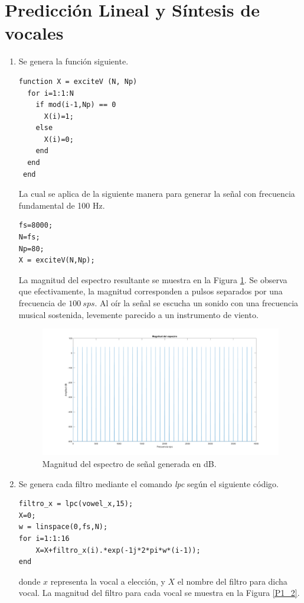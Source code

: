 \documentclass[letterpaper,onecolumn,10pt,journal,final]{IEEEtran}
\begin{document}
\section{Predicción Lineal y Síntesis de vocales}
\begin{enumerate}[1)]
    \item %
%
Se genera la función siguiente.
%
\begin{lstlisting}
function X = exciteV (N, Np)
  for i=1:1:N
    if mod(i-1,Np) == 0
      X(i)=1;
    else
      X(i)=0;
    end
  end
 end
\end{lstlisting}
%
La cual se aplica de la siguiente manera para generar la señal con frecuencia fundamental de 100 Hz.
%
\begin{lstlisting}
fs=8000;
N=fs;
Np=80;
X = exciteV(N,Np);
\end{lstlisting}
%
La magnitud del espectro resultante se muestra en la Figura \ref{P1_1}. Se observa que efectivamente, la magnitud corresponden a pulsos separados por una frecuencia de $100~sps$. Al oír la señal se escucha un sonido con una frecuencia musical sostenida, levemente parecido a un instrumento de viento.
%
\begin{figure}[H]
\centering
\includegraphics[width=1 \linewidth]{Figuras/P1_1.png}
\caption{Magnitud del espectro de señal generada en dB.}
\label{P1_1}
\end{figure} 
%
%
    \item %
%
Se genera cada filtro mediante el comando \textit{lpc} según el siguiente código.
%
\begin{lstlisting}
filtro_x = lpc(vowel_x,15);
X=0;
w = linspace(0,fs,N);
for i=1:1:16
    X=X+filtro_x(i).*exp(-1j*2*pi*w*(i-1));
end
\end{lstlisting}
%
donde $x$ representa la vocal a elección, y $X$ el nombre del filtro para dicha vocal. La magnitud del filtro para cada vocal se muestra en la Figura \ref{P1_2}.


\end{enumerate}
\end{document}

